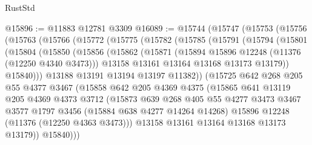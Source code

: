 \begin{lexlean}{RustStd}
\begin{coremodule}
{{{{{{{{{{{{{{{{{{{@15896 := @11883 @12781 @3309
@16089 := @15744
    (@15747
      (@15753
        (@15756
          (@15763
            (@15766
              (@15772
                (@15775
                  (@15782
                    (@15785
                      (@15791
                        (@15794
                          (@15801
                            (@15804
                              (@15850
                                (@15856
                                  (@15862
                                    (@15871
                                      (@15894 @15896 @12248 (@11376 (@12250 @4340 @3473)))
                                      @13158
                                      @13161
                                      @13164
                                      @13168
                                      @13173
                                      @13179))
                                  @15840)))
                            @13188
                            @13191
                            @13194
                            @13197
                            @11382))
                        (@15725
                          @642
                          @268
                          @205
                          @55
                          @4377
                          @3467
                          (@15858
                            @642
                            @205
                            @4369
                            @4375
                            (@15865
                              @641
                              @13119
                              @205
                              @4369
                              @4373
                              @3712
                              (@15873
                                @639
                                @268
                                @405
                                @55
                                @4277
                                @3473
                                @3467
                                @3577
                                @1797
                                @3456
                                (@15884 @638 @4277 @14264 @14268)
                                @15896
                                @12248
                                (@11376 (@12250 @4363 @3473)))
                              @13158
                              @13161
                              @13164
                              @13168
                              @13173
                              @13179))
                          @15840)))
}}}}}}}}}}}}}}}}}}}
\end{coremodule}
\end{lexlean}
